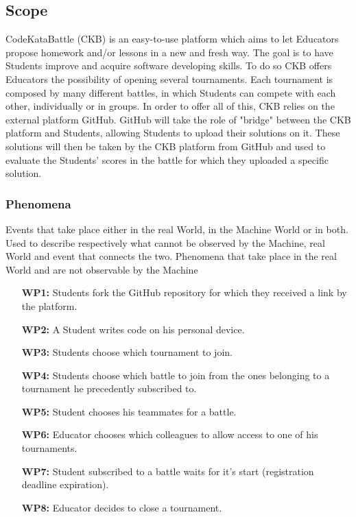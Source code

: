 \documentclass{article}
\newcounter{subsubsubsection}[subsubsection]
\begin{document}
\subsection{Scope}
CodeKataBattle (CKB) is an easy-to-use platform which aims to let Educators propose homework and/or lessons in a new and fresh way. 
The goal is to have Students improve and acquire software developing skills. To do so CKB offers Educators the possibility of opening 
several tournaments. Each tournament is composed by many different battles, in which Students can compete with each other, individually or in groups.
In order to offer all of this, CKB relies on the external platform GitHub. GitHub will take the role of "bridge" between the CKB platform and Students, 
allowing Students to upload their solutions on it. These solutions will then be taken by the CKB platform from GitHub and used to evaluate the Students' scores 
in the battle for which they uploaded a specific solution.
\subsubsection{Phenomena}
Events that take place either in the real World, in the Machine World or in both. Used to describe respectively what cannot be observed by the Machine, real 
World and event that connects the two.
Phenomena that take place in the real World and are not observable by the Machine
\begin{enumerate}
    \item[\textbf{WP1:}] Students fork the GitHub repository for which they received a link by the platform.
    \item[\textbf{WP2:}] A Student writes code on his personal device.
    \item[\textbf{WP3:}] Students choose which tournament to join.
    \item[\textbf{WP4:}] Students choose which battle to join from the ones belonging to a tournament he precedently subscribed to.
    \item[\textbf{WP5:}] Student chooses his teammates for a battle.
    \item[\textbf{WP6:}] Educator chooses which colleagues to allow access to one of his tournaments.
    \item[\textbf{WP7:}] Student subscribed to a battle waits for it's start (registration deadline expiration).
    \item[\textbf{WP8:}] Educator decides to close a tournament.
\end{enumerate}
\end{document}
